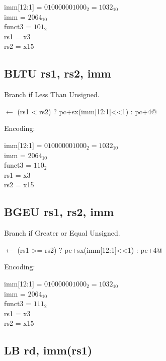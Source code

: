 imm[12:1] = $010000001000_2 = 1032_{10}$\\
imm = $2064_{10}$\\
funct3 = $101_2$\\
rs1 = x3\\
rs2 = x15

\subsection{BLTU rs1, rs2, imm}

Branch if Less Than Unsigned.

\verb@pc@ $\leftarrow$ \verb@(rs1 < rs2) ? pc+sx(imm[12:1]<<1) : pc+4@

Encoding:


imm[12:1] = $010000001000_2 = 1032_{10}$\\
imm = $2064_{10}$\\
funct3 = $110_2$\\
rs1 = x3\\
rs2 = x15


\subsection{BGEU rs1, rs2, imm}

Branch if Greater or Equal Unsigned.

\verb@pc@ $\leftarrow$ \verb@(rs1 >= rs2) ? pc+sx(imm[12:1]<<1) : pc+4@

Encoding:


imm[12:1] = $010000001000_2 = 1032_{10}$\\
imm = $2064_{10}$\\
funct3 = $111_2$\\
rs1 = x3\\
rs2 = x15

\subsection{LB rd, imm(rs1)}

